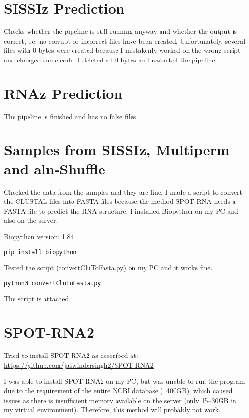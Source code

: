 \documentclass{article}
\begin{document}
\begin{large}
\section{SISSIz Prediction}

Checks whether the pipeline is still running anyway and whether the output is correct, i.e. no corrupt or incorrect files have been created. 
Unfortunately, several files with 0 bytes were created because I mistakenly worked on the wrong script and changed some code. 
I deleted all 0 bytes and restarted the pipeline.

\section{RNAz Prediction}

The pipeline is finished and has no false files.

\section{Samples from SISSIz, Multiperm and aln-Shuffle}

Checked the data from the samples and they are fine. 
I made a script to convert the CLUSTAL files into FASTA files because the method SPOT-RNA needs a FASTA file to predict the RNA structure. 
I installed Biopython on my PC and also on the server. 

Biopython version: 1.84

\begin{lstlisting}
pip install biopython
\end{lstlisting}

Tested the script (convertCluToFasta.py) on my PC and it works fine.

\begin{lstlisting}
python3 convertCluToFasta.py 
\end{lstlisting}

The script is attached.

\section{SPOT-RNA2}

Tried to install SPOT-RNA2 as described at:  
\url{https://github.com/jaswindersingh2/SPOT-RNA2}

I was able to install SPOT-RNA2 on my PC, but was unable to run the program due to the requirement of the entire NCBI database (~400GB), which caused issues as there is insufficient memory available on the server (only 15–30GB in my virtual environment).  
Therefore, this method will probably not work. 


\end{large}
\end{document}
